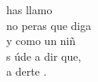 \begin{cancion}%
	  has llamo\\
	no peras que diga\\
	y como un niñ\\
	s úde a dir que, \\
	a derte .\\
\end{cancion}%

